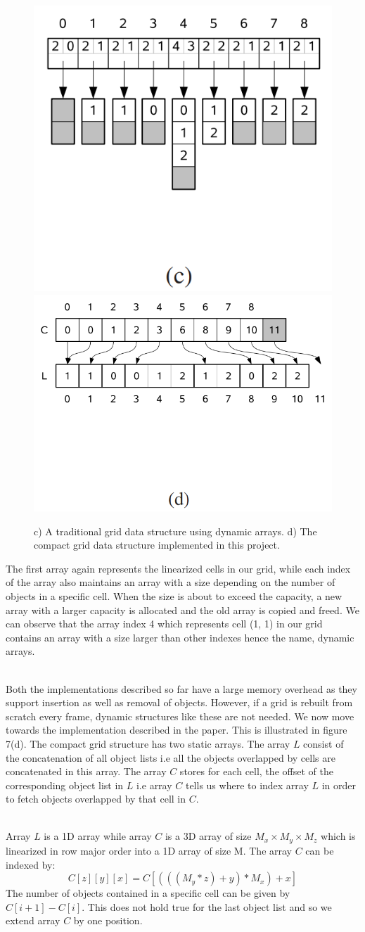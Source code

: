 \documentclass[11pt,a4paper]{article}
\begin{document}
\begin{figure}[H]
	\centering
	\captionsetup{justification=centering}
	\includegraphics[width=.3\textwidth]{uniformgrids3}\quad
	\includegraphics[width=.3\textwidth]{uniformgrids4}\quad
	\caption{c) A traditional grid data structure using dynamic arrays. d) The compact grid data structure implemented in this project.
 \protect\cite{lagae2008compact}}
\end{figure}
The first array again represents the linearized cells in our grid, while each index of the array also maintains an array with a size depending on the number of objects in a specific cell. When the size is about to exceed the capacity, a new array with a larger capacity is allocated and the old array is copied and freed. We can observe that the array index 4 which represents cell (1, 1) in our grid contains an array with a size larger than other indexes hence the name, dynamic arrays.

\noindent
\\
Both the implementations described so far have a large memory overhead as they support insertion as well as removal of objects. However, if a grid is rebuilt from scratch every frame, dynamic structures like these are not needed. We now move towards the implementation described in the paper. This is illustrated in figure 7(d). The compact grid structure has two static arrays. The array $L$ consist of the concatenation of all object lists i.e all the objects overlapped by cells are concatenated in this array. The array $C$ stores for each cell, the offset of the corresponding object list in $L$ i.e array $C$ tells us where to index array $L$ in order to fetch objects overlapped by that cell in $C$.

\noindent
\\
Array $L$ is a 1D array while array $C$ is a 3D array of size $M_{x} \times M_{y} \times M_{z}$ which is linearized in row major order into a 1D array of size M. The array $C$ can be indexed by:
\begin{equation}
C[z][y][x] = C[(((M_{y} * z) + y) * M_{x}) + x]
\end{equation}
The number of objects contained in a specific cell can be given by $C[i+1] - C[i]$. This does not hold true for the last object list and so we extend array $C$ by one position.
\\
\noindent
\end{document}

